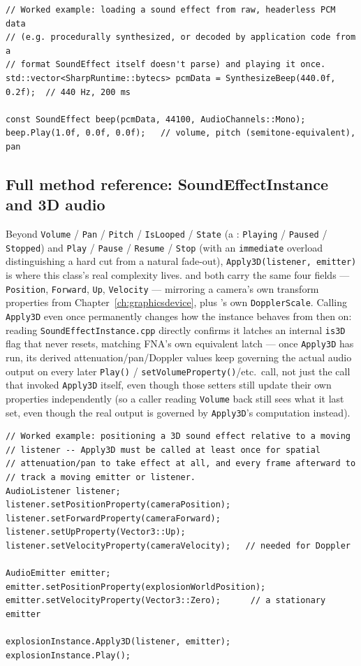 \begin{lstlisting}
// Worked example: loading a sound effect from raw, headerless PCM data
// (e.g. procedurally synthesized, or decoded by application code from a
// format SoundEffect itself doesn't parse) and playing it once.
std::vector<SharpRuntime::bytecs> pcmData = SynthesizeBeep(440.0f, 0.2f);  // 440 Hz, 200 ms

const SoundEffect beep(pcmData, 44100, AudioChannels::Mono);
beep.Play(1.0f, 0.0f, 0.0f);   // volume, pitch (semitone-equivalent), pan
\end{lstlisting}

\subsection{Full method reference: SoundEffectInstance and 3D audio}

Beyond \texttt{Volume} / \texttt{Pan} / \texttt{Pitch} / \texttt{IsLooped} / \texttt{State} (a
: \texttt{Playing} / \texttt{Paused} / \texttt{Stopped}) and
\texttt{Play} / \texttt{Pause} / \texttt{Resume} / \texttt{Stop} (with an \texttt{immediate} overload
distinguishing a hard cut from a natural fade-out), \texttt{Apply3D(listener, emitter)} is
where this class's real complexity lives.  and 
both carry the same four  fields --- \texttt{Position}, \texttt{Forward},
\texttt{Up}, \texttt{Velocity} --- mirroring a camera's own transform properties from
Chapter~\ref{ch:graphicsdevice}, plus 's own \texttt{DopplerScale}. Calling \texttt{Apply3D}
even once permanently changes how the instance behaves from then on: reading
\texttt{SoundEffectInstance.cpp} directly confirms it latches an internal \texttt{is3D} flag
that never resets, matching FNA's own equivalent latch --- once \texttt{Apply3D} has run, its
derived attenuation/pan/Doppler values keep governing the actual audio output on every later
\texttt{Play()} / \texttt{setVolumeProperty()}/etc.\ call, not just the call that invoked
\texttt{Apply3D} itself, even though those setters still update their own properties
independently (so a caller reading \texttt{Volume} back still sees what it last set, even
though the real output is governed by \texttt{Apply3D}'s computation instead).

\begin{lstlisting}
// Worked example: positioning a 3D sound effect relative to a moving
// listener -- Apply3D must be called at least once for spatial
// attenuation/pan to take effect at all, and every frame afterward to
// track a moving emitter or listener.
AudioListener listener;
listener.setPositionProperty(cameraPosition);
listener.setForwardProperty(cameraForward);
listener.setUpProperty(Vector3::Up);
listener.setVelocityProperty(cameraVelocity);   // needed for Doppler

AudioEmitter emitter;
emitter.setPositionProperty(explosionWorldPosition);
emitter.setVelocityProperty(Vector3::Zero);      // a stationary emitter

explosionInstance.Apply3D(listener, emitter);
explosionInstance.Play();
\end{lstlisting}

